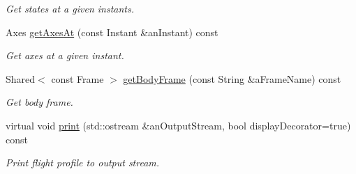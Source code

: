 \begin{DoxyCompactItemize}
\begin{DoxyCompactList}\small\item\em Get states at a given instants. \end{DoxyCompactList}\item 
Axes \hyperlink{classostk_1_1astro_1_1flight_1_1_profile_a04d4ef9a89d42586e8a782d1af9ee031}{get\+Axes\+At} (const Instant \&an\+Instant) const
\begin{DoxyCompactList}\small\item\em Get axes at a given instant. \end{DoxyCompactList}\item 
Shared$<$ const Frame $>$ \hyperlink{classostk_1_1astro_1_1flight_1_1_profile_abc2383de781cf911f4c275a5d02f3311}{get\+Body\+Frame} (const String \&a\+Frame\+Name) const
\begin{DoxyCompactList}\small\item\em Get body frame. \end{DoxyCompactList}\item 
virtual void \hyperlink{classostk_1_1astro_1_1flight_1_1_profile_a006797a25daa09426084c4df95e13b83}{print} (std\+::ostream \&an\+Output\+Stream, bool display\+Decorator=true) const
\begin{DoxyCompactList}\small\item\em Print flight profile to output stream. \end{DoxyCompactList}\end{DoxyCompactItemize}
